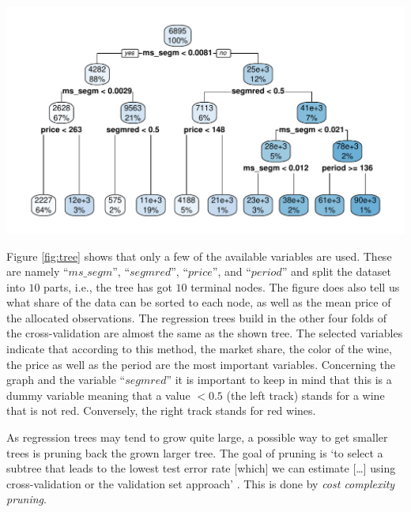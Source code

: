\documentclass[11pt,]{article}
\let\origfigure\figure
\let\endorigfigure\endfigure
\renewenvironment{figure}[1][2] {
    \expandafter\origfigure\expandafter[H]
} {
    \endorigfigure
}
\begin{document}
\begin{figure}
\centering
\includegraphics{../00_data/output_paper/09_tree.pdf}
\caption{\label{fig:tree}Example of a Regression Tree.}
\end{figure}

Figure \ref{fig:tree} shows that only a few of the available variables
are used. These are namely \enquote{\(ms\_segm\)},
\enquote{\(segmred\)}, \enquote{\(price\)}, and \enquote{\(period\)} and
split the dataset into \(10\) parts, i.e., the tree has got \(10\)
terminal nodes. The figure does also tell us what share of the data can
be sorted to each node, as well as the mean price of the allocated
observations. The regression trees build in the other four folds of the
cross-validation are almost the same as the shown tree. The selected
variables indicate that according to this method, the market share, the
color of the wine, the price as well as the period are the most
important variables. Concerning the graph and the variable
\enquote{\(segmred\)} it is important to keep in mind that this is a
dummy variable meaning that a value \(< 0.5\) (the left track) stands
for a wine that is not red. Conversely, the right track stands for red
wines.

As regression trees may tend to grow quite large, a possible way to get
smaller trees is pruning back the grown larger tree. The goal of pruning
is `to select a subtree that leads to the lowest test error rate
{[}which{]} we can estimate {[}\ldots{}{]} using cross-validation or the
validation set approach' \autocite[][p. 308]{James2014}. This is done by
\emph{cost complexity pruning}.
\end{document}
